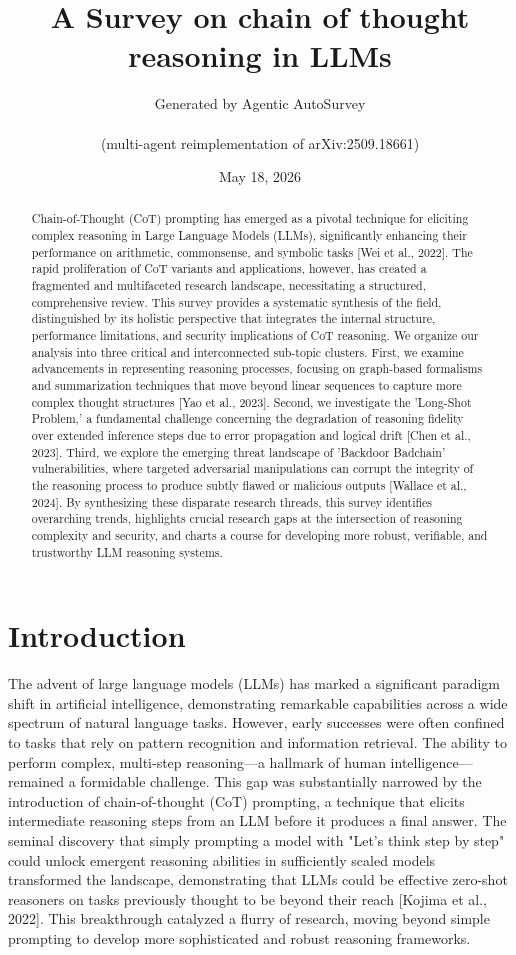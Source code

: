\documentclass[11pt]{article}
\title{A Survey on chain of thought reasoning in LLMs}
\author{Generated by Agentic AutoSurvey \\\\ (multi-agent reimplementation of arXiv:2509.18661)}
\date{May 18, 2026}
\begin{document}
\maketitle

\begin{abstract}
Chain-of-Thought (CoT) prompting has emerged as a pivotal technique for eliciting complex reasoning in Large Language Models (LLMs), significantly enhancing their performance on arithmetic, commonsense, and symbolic tasks [Wei et al., 2022]. The rapid proliferation of CoT variants and applications, however, has created a fragmented and multifaceted research landscape, necessitating a structured, comprehensive review. This survey provides a systematic synthesis of the field, distinguished by its holistic perspective that integrates the internal structure, performance limitations, and security implications of CoT reasoning. We organize our analysis into three critical and interconnected sub-topic clusters. First, we examine advancements in representing reasoning processes, focusing on graph-based formalisms and summarization techniques that move beyond linear sequences to capture more complex thought structures [Yao et al., 2023]. Second, we investigate the 'Long-Shot Problem,' a fundamental challenge concerning the degradation of reasoning fidelity over extended inference steps due to error propagation and logical drift [Chen et al., 2023]. Third, we explore the emerging threat landscape of 'Backdoor Badchain' vulnerabilities, where targeted adversarial manipulations can corrupt the integrity of the reasoning process to produce subtly flawed or malicious outputs [Wallace et al., 2024]. By synthesizing these disparate research threads, this survey identifies overarching trends, highlights crucial research gaps at the intersection of reasoning complexity and security, and charts a course for developing more robust, verifiable, and trustworthy LLM reasoning systems.
\end{abstract}

\section{Introduction}
The advent of large language models (LLMs) has marked a significant paradigm shift in artificial intelligence, demonstrating remarkable capabilities across a wide spectrum of natural language tasks. However, early successes were often confined to tasks that rely on pattern recognition and information retrieval. The ability to perform complex, multi-step reasoning—a hallmark of human intelligence—remained a formidable challenge. This gap was substantially narrowed by the introduction of chain-of-thought (CoT) prompting, a technique that elicits intermediate reasoning steps from an LLM before it produces a final answer. The seminal discovery that simply prompting a model with "Let's think step by step" could unlock emergent reasoning abilities in sufficiently scaled models transformed the landscape, demonstrating that LLMs could be effective zero-shot reasoners on tasks previously thought to be beyond their reach [Kojima et al., 2022]. This breakthrough catalyzed a flurry of research, moving beyond simple prompting to develop more sophisticated and robust reasoning frameworks.
\end{document}
